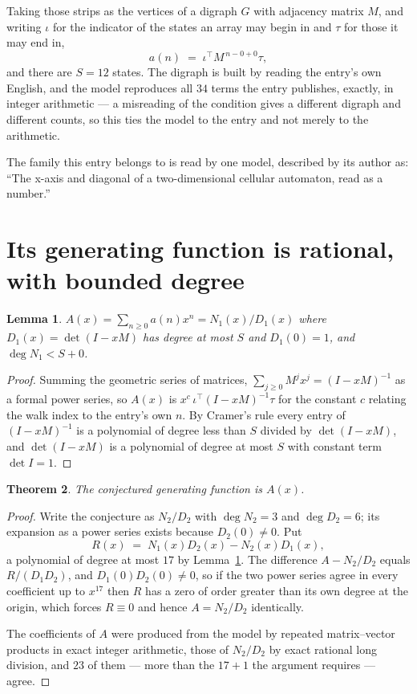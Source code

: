 \documentclass[11pt,a4paper]{article}
\theoremstyle{plain}
\newtheorem{theorem}{Theorem}
\newtheorem{lemma}[theorem]{Lemma}
\theoremstyle{definition}
\begin{document}
Taking those strips as the vertices of a digraph $G$ with adjacency matrix $M$, and writing
$\iota$ for the indicator of the states an array may begin in and $\tau$ for those it may end
in,
\[
a(n)\;=\;\iota^{\!\top}M^{\,n-0+0}\tau ,
\]
and there are $S=12$ states. The digraph is built by reading the entry's own English, and the
model reproduces all $34$ terms the entry publishes, exactly, in integer arithmetic --- a
misreading of the condition gives a different digraph and different counts, so this ties the
model to the entry and not merely to the arithmetic.

The family this entry belongs to is read by one model, described by its author as: ``The x-axis and diagonal of a two-dimensional cellular automaton, read as a number.''


\section{Its generating function is rational, with bounded degree}

\begin{lemma}\label{lem:rat}
$A(x)=\sum_{n\ge0}a(n)x^n=N_1(x)/D_1(x)$ where $D_1(x)=\det(I-xM)$ has degree at most
$S$ and $D_1(0)=1$, and $\deg N_1<S+0$.
\end{lemma}

\begin{proof}
Summing the geometric series of matrices, $\sum_{j\ge0}M^jx^j=(I-xM)^{-1}$ as a formal
power series, so $A(x)$ is $x^{c}\,\iota^{\!\top}(I-xM)^{-1}\tau$ for the constant $c$
relating the walk index to the entry's own $n$. By Cramer's rule every entry of
$(I-xM)^{-1}$ is a polynomial of degree less than $S$ divided by $\det(I-xM)$, and
$\det(I-xM)$ is a polynomial of degree at most $S$ with constant term $\det I=1$.
\end{proof}

\begin{theorem}
The conjectured generating function is $A(x)$.
\end{theorem}

\begin{proof}
Write the conjecture as $N_2/D_2$ with $\deg N_2=3$ and $\deg D_2=6$; its expansion as a
power series exists because $D_2(0)\neq0$. Put
\[
R(x)\;=\;N_1(x)D_2(x)-N_2(x)D_1(x),
\]
a polynomial of degree at most $17$ by Lemma~\ref{lem:rat}. The difference
$A-N_2/D_2$ equals $R/(D_1D_2)$, and $D_1(0)D_2(0)\neq0$, so if the two power series agree in
every coefficient up to $x^{17}$ then $R$ has a zero of order greater than its own
degree at the origin, which forces $R\equiv0$ and hence $A=N_2/D_2$ identically.

The coefficients of $A$ were produced from the model by repeated matrix--vector products in
exact integer arithmetic, those of $N_2/D_2$ by exact rational long division, and $23$
of them --- more than the $17+1$ the argument requires --- agree.
\end{proof}
\end{document}
